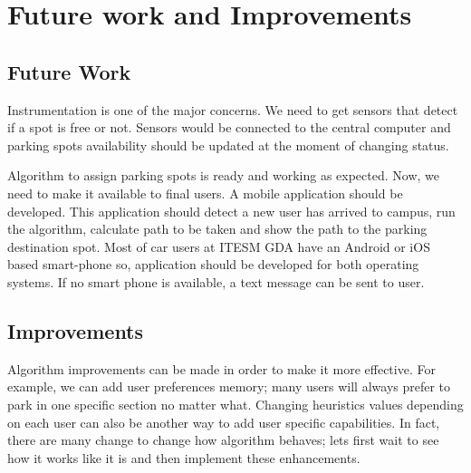 \chapter{Future work and Improvements}
\setlength{\parskip}{1em}
\section{Future Work}
Instrumentation is one of the major concerns. We need to get sensors that detect if a spot is free or not. Sensors would be connected to the central computer and parking spots availability should be updated at the moment of changing status. 

Algorithm to assign parking spots is ready and working as expected.  Now, we need to make it available to final users. A mobile application should be developed. This application should detect a new user has arrived to campus, run the algorithm, calculate path to be taken and show the path to the parking destination spot. Most of car users at ITESM GDA have an Android or iOS based smart-phone so, application should be developed for both operating systems.  If no smart phone is available, a text message can be sent to user. 

\section{Improvements}
Algorithm improvements can be made in order to make it more effective. For example, we can add user preferences memory; many users will always prefer to park in one specific section no matter what. Changing heuristics values depending on each user can also be another way to add user specific capabilities. In fact, there are many change to change how algorithm behaves; lets first wait to see how it works like it is and then implement these enhancements. 
